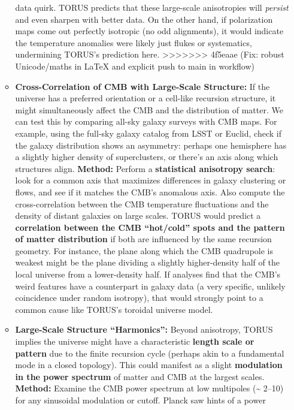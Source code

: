 \documentclass[]{article}
\begin{document}
\begin{itemize}
\begin{itemize}
    data quirk​. TORUS predicts that these large-scale anisotropies will
    \emph{persist} and even sharpen with better data​. On the other
    hand, if polarization maps come out perfectly isotropic (no odd
    alignments), it would indicate the temperature anomalies were likely
    just flukes or systematics, undermining TORUS's prediction here​.
>>>>>>> 4f5eaae (Fix: robust Unicode/maths in LaTeX and explicit push to main in workflow)
  \item
    \textbf{Cross-Correlation of CMB with Large-Scale Structure:} If the
    universe has a preferred orientation or a cell-like recursion
    structure, it might simultaneously affect the CMB and the
    distribution of matter. We can test this by comparing all-sky galaxy
    surveys with CMB maps​. For example, using the full-sky galaxy
    catalog from LSST or Euclid, check if the galaxy distribution shows
    an asymmetry: perhaps one hemisphere has a slightly higher density
    of superclusters, or there's an axis along which structures align.
    \textbf{Method:} Perform a \textbf{statistical anisotropy search}:
    look for a common axis that maximizes differences in galaxy
    clustering or flows, and see if it matches the CMB's anomalous axis.
    Also compute the cross-correlation between the CMB temperature
    fluctuations and the density of distant galaxies on large scales.
    TORUS would predict a \textbf{correlation between the CMB
    ``hot/cold'' spots and the pattern of matter distribution} if both
    are influenced by the same recursion geometry​. For instance, the
    plane along which the CMB quadrupole is weakest might be the plane
    dividing a slightly higher-density half of the local universe from a
    lower-density half​. If analyses find that the CMB's weird features
    have a counterpart in galaxy data (a very specific, unlikely
    coincidence under random isotropy), that would strongly point to a
    common cause like TORUS's toroidal universe model​.
  \item
    \textbf{Large-Scale Structure ``Harmonics'':} Beyond anisotropy,
    TORUS implies the universe might have a characteristic
    \textbf{length scale or pattern} due to the finite recursion cycle
    (perhaps akin to a fundamental mode in a closed topology). This
    could manifest as a slight \textbf{modulation in the power spectrum}
    of matter and CMB at the largest scales. \textbf{Method:} Examine
    the CMB power spectrum at low multipoles (\ell \textasciitilde{} 2--10)
    for any sinusoidal modulation or cutoff. Planck saw hints of a power

\end{itemize}
\end{itemize}
\end{document}
